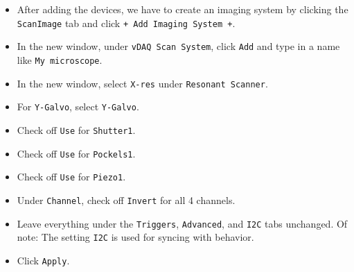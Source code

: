 \documentclass[10pt,letterpaper]{article}
\begin{document}
\begin{itemize}
    \item After adding the devices, we have to create an imaging system by clicking the \texttt{ScanImage} tab and click \texttt{+ Add Imaging System +}.
    \item In the new window, under \texttt{vDAQ Scan System}, click \texttt{Add} and type in a name like \texttt{My microscope}.
    \item In the new window, select \texttt{X-res} under \texttt{Resonant Scanner}.
    \item For \texttt{Y-Galvo}, select \texttt{Y-Galvo}.
    \item Check off \texttt{Use} for \texttt{Shutter1}.
    \item Check off \texttt{Use} for \texttt{Pockels1}.
    \item Check off \texttt{Use} for \texttt{Piezo1}.
    \item Under \texttt{Channel}, check off \texttt{Invert} for all 4 channels.
    \item Leave everything under the \texttt{Triggers}, \texttt{Advanced}, and \texttt{I2C} tabs unchanged. Of note: The setting \texttt{I2C} is used for syncing with behavior.
    \item Click \texttt{Apply}.
\end{itemize}
%
\end{document}
